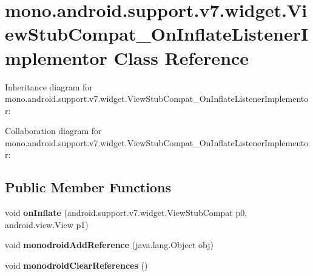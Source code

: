 \hypertarget{classmono_1_1android_1_1support_1_1v7_1_1widget_1_1_view_stub_compat___on_inflate_listener_implementor}{}\section{mono.\+android.\+support.\+v7.\+widget.\+View\+Stub\+Compat\+\_\+\+On\+Inflate\+Listener\+Implementor Class Reference}
\label{classmono_1_1android_1_1support_1_1v7_1_1widget_1_1_view_stub_compat___on_inflate_listener_implementor}


Inheritance diagram for mono.\+android.\+support.\+v7.\+widget.\+View\+Stub\+Compat\+\_\+\+On\+Inflate\+Listener\+Implementor\+:


Collaboration diagram for mono.\+android.\+support.\+v7.\+widget.\+View\+Stub\+Compat\+\_\+\+On\+Inflate\+Listener\+Implementor\+:
\subsection*{Public Member Functions}
\begin{DoxyCompactItemize}
\item 
\mbox{\label{classmono_1_1android_1_1support_1_1v7_1_1widget_1_1_view_stub_compat___on_inflate_listener_implementor_af5dd2c498ef67b36825b1c2071bf528f}} 
void {\bfseries on\+Inflate} (android.\+support.\+v7.\+widget.\+View\+Stub\+Compat p0, android.\+view.\+View p1)
\item 
\mbox{\label{classmono_1_1android_1_1support_1_1v7_1_1widget_1_1_view_stub_compat___on_inflate_listener_implementor_ac26d53bed514e46ac48a1704e5a0f7f5}} 
void {\bfseries monodroid\+Add\+Reference} (java.\+lang.\+Object obj)
\item 
\mbox{\label{classmono_1_1android_1_1support_1_1v7_1_1widget_1_1_view_stub_compat___on_inflate_listener_implementor_abf26bd40d8c3a6339bfbc544da762a52}} 
void {\bfseries monodroid\+Clear\+References} ()
\end{DoxyCompactItemize}

